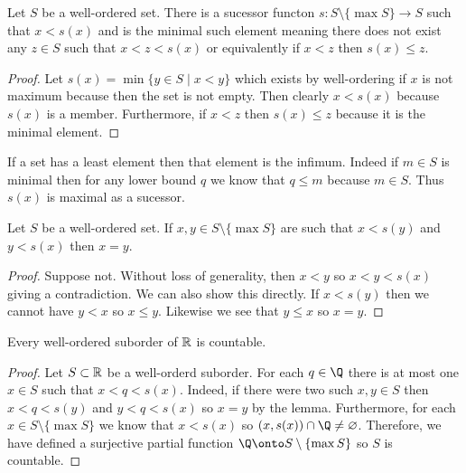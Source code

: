 \documentclass[12pt]{article}
\begin{document}
\begin{lemma}
Let $S$ be a well-ordered set. There is a sucessor functon $s : S \setminus \{ \max S \} \to S$ such that $x < s(x)$ and is the minimal such element meaning there does not exist any $z \in S$ such that $x < z < s(x)$ or equivalently if $x < z$ then $s(x) \le z$.
\end{lemma}

\begin{proof}
Let $s(x) = \min \{ y \in S \mid x < y \}$ which exists by well-ordering if $x$ is not maximum because then the set is not empty. Then clearly $x < s(x)$ because $s(x)$ is a member. Furthermore, if $x < z$ then $s(x) \le z$ because it is the minimal element.
\end{proof}

\begin{rmk}
If a set has a least element then that element is the infimum. Indeed if $m \in S$ is minimal then for any lower bound $q$ we know that $q \le m$ because $m \in S$. Thus $s(x)$ is maximal as a sucessor.
\end{rmk}

\begin{lemma}
Let $S$ be a well-ordered set. If $x,y \in S \setminus \{ \max S \}$ are such that $x < s(y)$ and $y < s(x)$ then $x = y$.
\end{lemma}

\begin{proof}
Suppose not. Without loss of generality, then $x < y$ so $x < y < s(x)$ giving a contradiction. We can also show this directly. If $x < s(y)$ then we cannot have $y < x$ so $x \le y$. Likewise we see that $y \le x$ so $x = y$.
\end{proof}

\begin{prop}
Every well-ordered suborder of $\mathbb{R}$ is countable.
\end{prop}

\begin{proof}
Let $S \subset \mathbb{R}$ be a well-orderd suborder. For each $q \in \Q$ there is  at most one $x \in S$ such that $x < q < s(x)$. Indeed, if there were two such $x,y \in S$ then $x < q < s(y)$ and $y < q < s(x)$ so $x = y$ by the lemma. Furthermore, for each $x \in S \setminus \{ \max S \}$ we know that $x < s(x)$ so $(x, s(x)) \cap \Q \neq \varnothing$. Therefore, we have defined a surjective partial function $\Q \onto S \setminus \{ \max S \}$ so $S$ is countable.
\end{proof}
\end{document}
